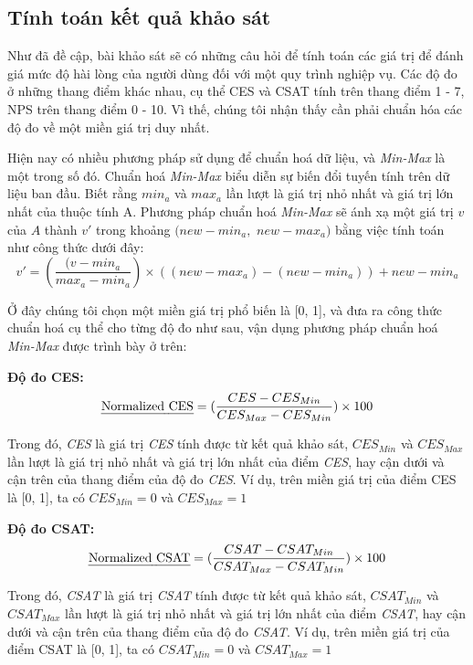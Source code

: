 \subsection{Tính toán kết quả khảo sát}
Như đã đề cập, bài khảo sát sẽ có những câu hỏi để tính toán các giá trị để đánh giá mức độ hài lòng của người dùng đối với một quy trình nghiệp vụ. Các độ đo ở những thang điểm khác nhau, cụ thể CES và CSAT tính trên thang điểm 1 - 7, NPS trên thang điểm 0 - 10. Vì thế, chúng tôi nhận thấy cần phải chuẩn hóa các độ đo về một miền giá trị duy nhất. 
\par
Hiện nay có nhiều phương pháp sử dụng để chuẩn hoá dữ liệu, và \emph{Min-Max} là một trong số đó. Chuẩn hoá \emph{Min-Max} biểu diễn sự biến đổi tuyến tính trên dữ liệu ban đầu. Biết rằng $min_a$ và $max_a$ lần lượt là giá trị nhỏ nhất và giá trị lớn nhất của thuộc tính A. Phương pháp chuẩn hoá \emph{Min-Max} sẽ ánh xạ một giá trị $v$ của $A$ thành $v'$ trong khoảng $(new-min_a,$ $new-max_a)$ bằng việc tính toán như công thức dưới đây:
\[ v' = (\frac{(v - min_a}{max_a - min_a}) \times ((new-max_a) - (new-min_a)) + new-min_a\]

Ở đây chúng tôi chọn một miền giá trị phổ biến là [0, 1], và đưa ra công thức chuẩn hoá cụ thể cho từng độ đo như sau, vận dụng phương pháp chuẩn hoá \emph{Min-Max} được trình bày ở trên:

\textbf{Độ đo CES:}
\[ \text{\emph{Normalized CES}} = (\frac{CES - CES_{Min}}{CES_{Max} - CES_{Min}}) \times 100\]
\par
Trong đó, \emph{CES} là giá trị \emph{CES} tính được từ kết quả khảo sát, $CES_{Min}$ và $CES_{Max}$ lần lượt là giá trị nhỏ nhất và giá trị lớn nhất của điểm \emph{CES}, hay cận dưới và cận trên của thang điểm của độ đo \emph{CES}. Ví dụ, trên miền giá trị của điểm CES là [0, 1], ta có $CES_{Min} = 0$ và $CES_{Max} = 1$

\textbf{Độ đo CSAT:}
\[ \text{\emph{Normalized CSAT}} = (\frac{CSAT - CSAT_{Min}}{CSAT_{Max} - CSAT_{Min}}) \times 100\]
\par
Trong đó, \emph{CSAT} là giá trị \emph{CSAT} tính được từ kết quả khảo sát, $CSAT_{Min}$ và $CSAT_{Max}$ lần lượt là giá trị nhỏ nhất và giá trị lớn nhất của điểm \emph{CSAT}, hay cận dưới và cận trên của thang điểm của độ đo \emph{CSAT}. Ví dụ, trên miền giá trị của điểm CSAT là [0, 1], ta có $CSAT_{Min} = 0$ và $CSAT_{Max} = 1$

